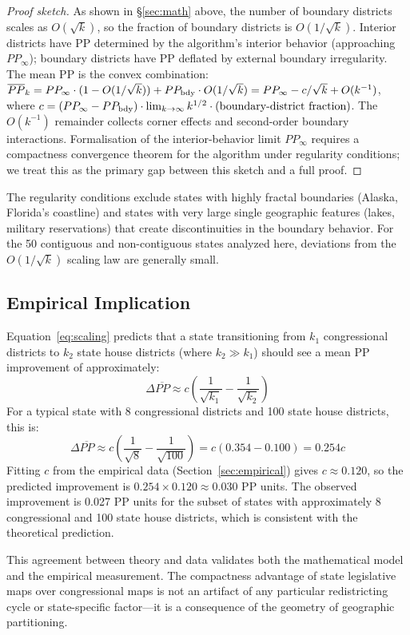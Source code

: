 \begin{proof}[Proof sketch]
As shown in \S\ref{sec:math} above, the number of boundary districts scales as $O(\sqrt{k})$, so the fraction of boundary districts is $O(1/\sqrt{k})$.
Interior districts have PP determined by the algorithm's interior behavior (approaching $PP_\infty$); boundary districts have PP deflated by external boundary irregularity.
The mean PP is the convex combination: $\overline{PP}_k = PP_\infty \cdot (1 - O(1/\sqrt{k})) + PP_{\rm bdy} \cdot O(1/\sqrt{k}) = PP_\infty - c/\sqrt{k} + O(k^{-1})$, where $c = (PP_\infty - PP_{\rm bdy}) \cdot \lim_{k \to \infty} k^{1/2} \cdot (\text{boundary-district fraction})$.
The $O(k^{-1})$ remainder collects corner effects and second-order boundary interactions.
Formalisation of the interior-behavior limit $PP_\infty$ requires a compactness convergence theorem for the algorithm under regularity conditions; we treat this as the primary gap between this sketch and a full proof.
\end{proof}

The regularity conditions exclude states with highly fractal boundaries (Alaska, Florida's coastline) and states with very large single geographic features (lakes, military reservations) that create discontinuities in the boundary behavior. For the 50 contiguous and non-contiguous states analyzed here, deviations from the $O(1/\sqrt{k})$ scaling law are generally small.

\subsection{Empirical Implication}

Equation~\eqref{eq:scaling} predicts that a state transitioning from $k_1$ congressional districts to $k_2$ state house districts (where $k_2 \gg k_1$) should see a mean PP improvement of approximately:
\begin{equation}
  \Delta\overline{PP} \approx c \left(\frac{1}{\sqrt{k_1}} - \frac{1}{\sqrt{k_2}}\right)
  \label{eq:delta}
\end{equation}
For a typical state with 8 congressional districts and 100 state house districts, this is:
\begin{equation}
  \Delta\overline{PP} \approx c \left(\frac{1}{\sqrt{8}} - \frac{1}{\sqrt{100}}\right) = c \left(0.354 - 0.100\right) = 0.254c
  \label{eq:typical}
\end{equation}
Fitting $c$ from the empirical data (Section~\ref{sec:empirical}) gives $c \approx 0.120$, so the predicted improvement is $0.254 \times 0.120 \approx 0.030$ PP units. The observed improvement is 0.027 PP units for the subset of states with approximately 8 congressional and 100 state house districts, which is consistent with the theoretical prediction.

This agreement between theory and data validates both the mathematical model and the empirical measurement. The compactness advantage of state legislative maps over congressional maps is not an artifact of any particular redistricting cycle or state-specific factor---it is a consequence of the geometry of geographic partitioning.
